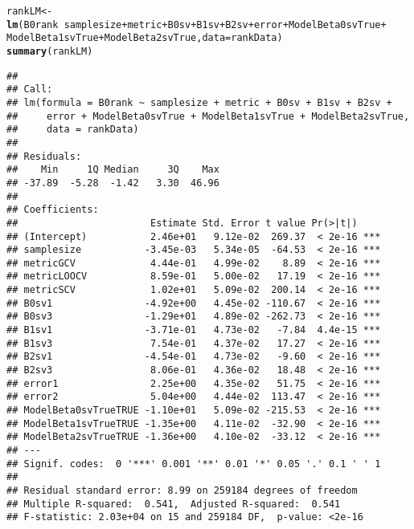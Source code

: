 \documentclass{article}\usepackage[]{graphicx}\usepackage[]{color}
\makeatletter
\newcommand{\hlopt}[1]{\textcolor[rgb]{0,0,0}{#1}}%
\newcommand{\hlstd}[1]{\textcolor[rgb]{0.345,0.345,0.345}{#1}}%
\newcommand{\hlkwb}[1]{\textcolor[rgb]{0.69,0.353,0.396}{#1}}%
\newcommand{\hlkwc}[1]{\textcolor[rgb]{0.333,0.667,0.333}{#1}}%
\newcommand{\hlkwd}[1]{\textcolor[rgb]{0.737,0.353,0.396}{\textbf{#1}}}%
\newenvironment{kframe}{%
 \def\at@end@of@kframe{}%
 \ifinner\ifhmode%
  \def\at@end@of@kframe{\end{minipage}}%
  \begin{minipage}{\columnwidth}%
 \fi\fi%
 \def\FrameCommand##1{\hskip\@totalleftmargin \hskip-\fboxsep
 \colorbox{shadecolor}{##1}\hskip-\fboxsep
     \hskip-\linewidth \hskip-\@totalleftmargin \hskip\columnwidth}%
 \MakeFramed {\advance\hsize-\width
   \@totalleftmargin\z@ \linewidth\hsize
   \@setminipage}}%
 {\par\unskip\endMakeFramed%
 \at@end@of@kframe}
\newenvironment{knitrout}{}{} %
\makeatother
\begin{document}
\begin{knitrout}
\color{fgcolor}\begin{kframe}
\begin{alltt}
\hlstd{rankLM} \hlkwb{<-} \hlkwd{lm}\hlstd{(B0rank} \hlopt{~} \hlstd{samplesize} \hlopt{+} \hlstd{metric} \hlopt{+} \hlstd{B0sv} \hlopt{+} \hlstd{B1sv} \hlopt{+} \hlstd{B2sv} \hlopt{+} \hlstd{error} \hlopt{+} \hlstd{ModelBeta0svTrue} \hlopt{+}
    \hlstd{ModelBeta1svTrue} \hlopt{+} \hlstd{ModelBeta2svTrue,} \hlkwc{data} \hlstd{= rankData)}
\hlkwd{summary}\hlstd{(rankLM)}
\end{alltt}
\begin{verbatim}
## 
## Call:
## lm(formula = B0rank ~ samplesize + metric + B0sv + B1sv + B2sv + 
##     error + ModelBeta0svTrue + ModelBeta1svTrue + ModelBeta2svTrue, 
##     data = rankData)
## 
## Residuals:
##    Min     1Q Median     3Q    Max 
## -37.89  -5.28  -1.42   3.30  46.96 
## 
## Coefficients:
##                       Estimate Std. Error t value Pr(>|t|)    
## (Intercept)           2.46e+01   9.12e-02  269.37  < 2e-16 ***
## samplesize           -3.45e-03   5.34e-05  -64.53  < 2e-16 ***
## metricGCV             4.44e-01   4.99e-02    8.89  < 2e-16 ***
## metricLOOCV           8.59e-01   5.00e-02   17.19  < 2e-16 ***
## metricSCV             1.02e+01   5.09e-02  200.14  < 2e-16 ***
## B0sv1                -4.92e+00   4.45e-02 -110.67  < 2e-16 ***
## B0sv3                -1.29e+01   4.89e-02 -262.73  < 2e-16 ***
## B1sv1                -3.71e-01   4.73e-02   -7.84  4.4e-15 ***
## B1sv3                 7.54e-01   4.37e-02   17.27  < 2e-16 ***
## B2sv1                -4.54e-01   4.73e-02   -9.60  < 2e-16 ***
## B2sv3                 8.06e-01   4.36e-02   18.48  < 2e-16 ***
## error1                2.25e+00   4.35e-02   51.75  < 2e-16 ***
## error2                5.04e+00   4.44e-02  113.47  < 2e-16 ***
## ModelBeta0svTrueTRUE -1.10e+01   5.09e-02 -215.53  < 2e-16 ***
## ModelBeta1svTrueTRUE -1.35e+00   4.11e-02  -32.90  < 2e-16 ***
## ModelBeta2svTrueTRUE -1.36e+00   4.10e-02  -33.12  < 2e-16 ***
## ---
## Signif. codes:  0 '***' 0.001 '**' 0.01 '*' 0.05 '.' 0.1 ' ' 1
## 
## Residual standard error: 8.99 on 259184 degrees of freedom
## Multiple R-squared:  0.541,	Adjusted R-squared:  0.541 
## F-statistic: 2.03e+04 on 15 and 259184 DF,  p-value: <2e-16
\end{verbatim}
\end{kframe}
\end{knitrout}
\end{document}
